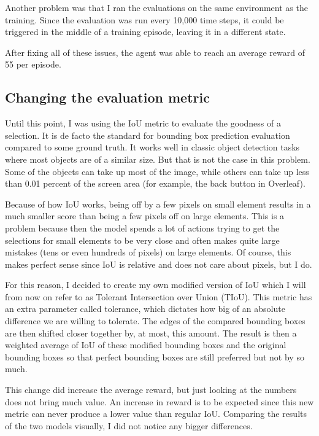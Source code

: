\documentclass[
  digital,     %
  oneside,     %
  nosansbold,  %
  nocolorbold, %
  lof,         %
  lot,         %
]{fithesis4}
\begin{document}
Another problem was that I ran the evaluations on the same environment as the training. Since the evaluation was run every 10,000 time steps, it could be triggered in the middle of a training episode, leaving it in a different state.

After fixing all of these issues, the agent was able to reach an average reward of 55 per episode.

\subsection{Changing the evaluation metric}

Until this point, I was using the IoU metric to evaluate the goodness of a selection. It is de facto the standard for bounding box prediction evaluation compared to some ground truth. It works well in classic object detection tasks where most objects are of a similar size. But that is not the case in this problem. Some of the objects can take up most of the image, while others can take up less than 0.01 percent of the screen area (for example, the back button in Overleaf).

Because of how IoU works, being off by a few pixels on small element results in a much smaller score than being a few pixels off on large elements. This is a problem because then the model spends a lot of actions trying to get the selections for small elements to be very close and often makes quite large mistakes (tens or even hundreds of pixels) on large elements. Of course, this makes perfect sense since IoU is relative and does not care about pixels, but I do.

For this reason, I decided to create my own modified version of IoU which I will from now on refer to as Tolerant Intersection over Union (TIoU). This metric has an extra parameter called tolerance, which dictates how big of an absolute difference we are willing to tolerate. The edges of the compared bounding boxes are then shifted closer together by, at most, this amount. The result is then a weighted average of IoU of these modified bounding boxes and the original bounding boxes so that perfect bounding boxes are still preferred but not by so much.

This change did increase the average reward, but just looking at the numbers does not bring much value. An increase in reward is to be expected since this new metric can never produce a lower value than regular IoU. Comparing the results of the two models visually, I did not notice any bigger differences.
\end{document}
